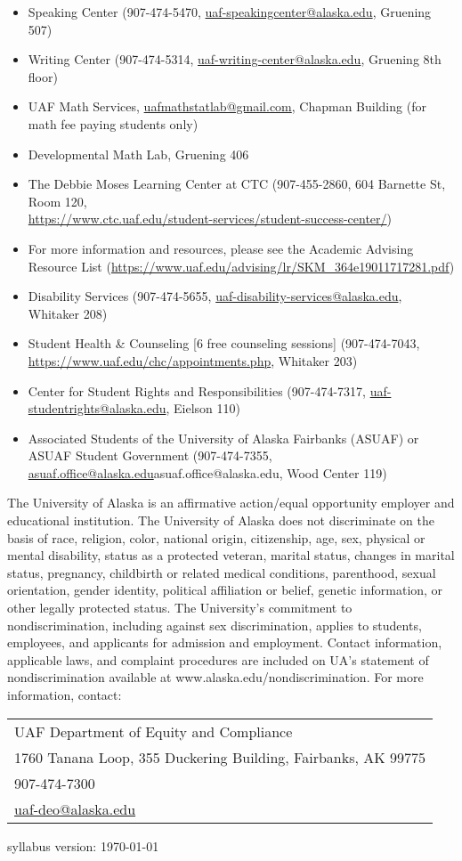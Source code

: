 \documentclass[12pt]{article}
\def\mailto#1{\href{mailto:#1}{#1}}
\begin{document}
\begin{itemize}
\setlength\itemsep{0em}
        \item Speaking Center (907-474-5470,
        \mailto{uaf-speakingcenter@alaska.edu}, Gruening 507)
\item Writing Center (907-474-5314, \mailto{uaf-writing-center@alaska.edu}, Gruening 8th floor)
\item UAF Math Services, \mailto{uafmathstatlab@gmail.com}, Chapman Building (for math fee paying students only)
\item Developmental Math Lab, Gruening 406
\item The Debbie Moses Learning Center at CTC (907-455-2860, 604 Barnette St, Room 120,\\ \mailto{https://www.ctc.uaf.edu/student-services/student-success-center/})
\item For more information and resources, please see the Academic Advising Resource List (\url{https://www.uaf.edu/advising/lr/SKM_364e19011717281.pdf})
\end{itemize}

\begin{itemize}
\setlength\itemsep{0em}
\item Disability Services (907-474-5655, \mailto{uaf-disability-services@alaska.edu}, Whitaker 208)
\item Student Health \& Counseling [6 free counseling sessions] (907-474-7043, \url{https://www.uaf.edu/chc/appointments.php}, Whitaker 203)
\item Center for Student Rights and Responsibilities (907-474-7317, \mailto{uaf-studentrights@alaska.edu}, Eielson 110)
\item Associated Students of the University of Alaska Fairbanks (ASUAF) or ASUAF Student Government (907-474-7355, \mailto{asuaf.office@alaska.edu}{asuaf.office@alaska.edu}, Wood Center 119)
\end{itemize}

The University of Alaska is an affirmative action/equal opportunity employer and educational institution. The University of Alaska does not discriminate on the basis of race, religion, color, national origin, citizenship, age, sex, physical or mental disability, status as a protected veteran, marital status, changes in marital status, pregnancy, childbirth or related medical conditions, parenthood, sexual orientation, gender identity, political affiliation or belief, genetic information, or other legally protected status. The University's commitment to nondiscrimination, including against sex discrimination, applies to students, employees, and applicants for admission and employment. Contact information, applicable laws, and complaint procedures are included on UA's statement of nondiscrimination available at www.alaska.edu/nondiscrimination. For more information, contact:

\begin{tabular}{l}
UAF Department of Equity and Compliance\\
1760 Tanana Loop, 355 Duckering Building, Fairbanks, AK  99775\\
907-474-7300\\
\mailto{uaf-deo@alaska.edu}
\end{tabular}

 \scriptsize syllabus version: \today \normalsize
\end{document}
